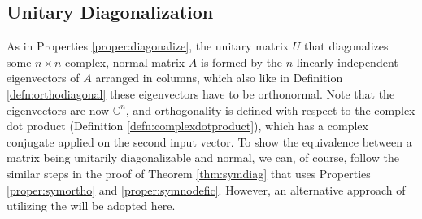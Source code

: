 \subsection{Unitary Diagonalization}

As in Properties \ref{proper:diagonalize}, the unitary matrix $U$ that diagonalizes some $n \times n$ complex, normal matrix $A$ is formed by the $n$ linearly independent eigenvectors of $A$ arranged in columns, which also like in Definition \ref{defn:orthodiagonal} these eigenvectors have to be orthonormal. Note that the eigenvectors are now $\mathbb{C}^n$, and orthogonality is defined with respect to the complex dot product (Definition \ref{defn:complexdotproduct}), which has a complex conjugate applied on the second input vector. To show the equivalence between a matrix being unitarily diagonalizable and normal, we can, of course, follow the similar steps in the proof of Theorem \ref{thm:symdiag} that uses Properties \ref{proper:symortho} and \ref{proper:symnodefic}. However, an alternative approach of utilizing the  will be adopted here.

